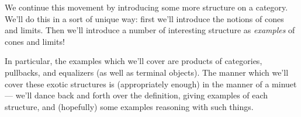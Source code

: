 
We continue this movement by introducing some more structure on a
category. We'll do this in a sort of unique way: first we'll
introduce the notions of cones and limits. Then we'll introduce a
number of interesting structure as \emph{examples} of cones and
limits! 

In particular, the examples which we'll cover are products of
categories, pullbacks, and equalizers (as well as terminal
objects). The manner which we'll cover these exotic structures is
(appropriately enough) in the manner of a minuet --- we'll dance
back and forth over the definition, giving examples of each
structure, and (hopefully) some examples reasoning with such things.
